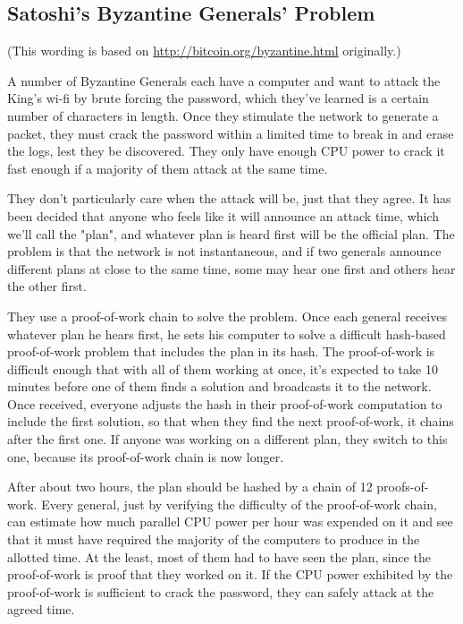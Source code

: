 \documentclass[letterpaper]{article}
\begin{document}
\subsection{Satoshi's Byzantine Generals' Problem}

(This wording is based on \url{http://bitcoin.org/byzantine.html} originally.)

A number of Byzantine Generals each have a computer and want to attack the
King's wi-fi by brute forcing the password, which they've learned is a certain
number of characters in length. Once they stimulate the network to generate a
packet, they must crack the password within a limited time to break in and
erase the logs, lest they be discovered. They only have enough CPU power to
crack it fast enough if a majority of them attack at the same time.

They don't particularly care when the attack will be, just that they agree. It
has been decided that anyone who feels like it will announce an attack time,
which we'll call the "plan", and whatever plan is heard first will be the
official plan. The problem is that the network is not instantaneous, and if two
generals announce different plans at close to the same time, some may hear one
first and others hear the other first.

They use a proof-of-work chain to solve the problem. Once each general receives
whatever plan he hears first, he sets his computer to solve a difficult
hash-based proof-of-work problem that includes the plan in its hash. The
proof-of-work is difficult enough that with all of them working at once, it's
expected to take 10 minutes before one of them finds a solution and broadcasts
it to the network. Once received, everyone adjusts the hash in their
proof-of-work computation to include the first solution, so that when they find
the next proof-of-work, it chains after the first one. If anyone was working on
a different plan, they switch to this one, because its proof-of-work chain is
now longer.

After about two hours, the plan should be hashed by a chain of 12
proofs-of-work. Every general, just by verifying the difficulty of the
proof-of-work chain, can estimate how much parallel CPU power per hour was
expended on it and see that it must have required the majority of the computers
to produce in the allotted time. At the least, most of them had to have seen
the plan, since the proof-of-work is proof that they worked on it. If the CPU
power exhibited by the proof-of-work is sufficient to crack the password, they
can safely attack at the agreed time.
\end{document}

